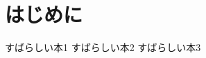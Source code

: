 \documentclass[uplatex]{jsarticle}
\begin{document}
  \tableofcontents

  \clearpage

  \section{はじめに}
  \begin{thebibliography}{9}
     すばらしい本1
     すばらしい本2
     すばらしい本3
  \end{thebibliography}
\end{document}
